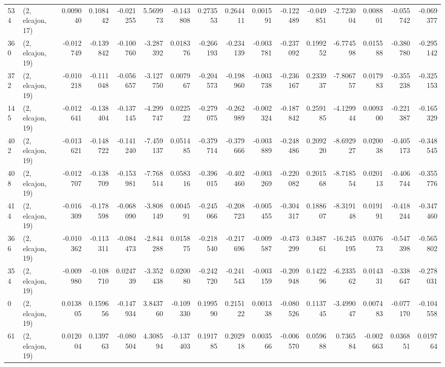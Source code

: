 \begin{tabular}{llrrrrrrrrrrrrrr}
534 &  (2, elcajon, 17) &   0.009040 &  0.108442 & -0.021255 &    5.569973 & -0.143808 &   0.273553 &   0.264411 &  0.001591 & -0.122489 & -0.049851 &   -2.723004 &  0.008801 &  -0.055742 &  -0.069377 \\
360 &  (2, elcajon, 19) &  -0.012749 & -0.139842 & -0.100760 &   -3.287392 &  0.018376 &  -0.266193 &  -0.234139 & -0.003781 & -0.237092 &  0.199252 &   -6.774598 &  0.015588 &  -0.380780 &  -0.295142 \\
372 &  (2, elcajon, 19) &  -0.010218 & -0.111048 & -0.056657 &   -3.127750 &  0.007967 &  -0.204573 &  -0.198960 & -0.003738 & -0.236167 &  0.233937 &   -7.806757 &  0.017983 &  -0.355238 &  -0.325153 \\
145 &  (2, elcajon, 19) &  -0.012641 & -0.138404 & -0.137145 &   -4.299747 &  0.022522 &  -0.279075 &  -0.262989 & -0.002324 & -0.187842 &  0.259185 &   -4.129944 &  0.009300 &  -0.221387 &  -0.165329 \\
402 &  (2, elcajon, 19) &  -0.013621 & -0.148722 & -0.141240 &   -7.459137 &  0.051485 &  -0.379714 &  -0.379666 & -0.003889 & -0.248486 &  0.209220 &   -8.692927 &  0.020038 &  -0.405173 &  -0.348545 \\
408 &  (2, elcajon, 19) &  -0.012707 & -0.138709 & -0.153981 &   -7.768514 &  0.058316 &  -0.396015 &  -0.402460 & -0.003269 & -0.220082 &  0.201568 &   -8.718554 &  0.020113 &  -0.406744 &  -0.355776 \\
414 &  (2, elcajon, 19) &  -0.016309 & -0.178598 & -0.068090 &   -3.808149 &  0.004591 &  -0.245066 &  -0.208723 & -0.005455 & -0.304317 &  0.188607 &   -8.319148 &  0.019191 &  -0.418244 &  -0.347460 \\
366 &  (2, elcajon, 19) &  -0.010362 & -0.113311 & -0.084473 &   -2.844288 &  0.015875 &  -0.218540 &  -0.217696 & -0.009587 & -0.473299 &  0.348761 &  -16.245195 &  0.037673 &  -0.547398 &  -0.565802 \\
354 &  (2, elcajon, 19) &  -0.009980 & -0.108710 &  0.024739 &   -3.352438 &  0.020080 &  -0.242720 &  -0.241543 & -0.003159 & -0.209948 &  0.142296 &   -6.233562 &  0.014331 &  -0.338647 &  -0.278031 \\
0   &  (2, elcajon, 19) &   0.013805 &  0.159656 & -0.147934 &    3.843760 & -0.109330 &   0.199590 &   0.215122 &  0.001338 & -0.080526 &  0.113745 &   -3.499047 &  0.007483 &  -0.077170 &  -0.104558 \\
61  &  (2, elcajon, 19) &   0.012004 &  0.139763 & -0.080504 &    4.308594 & -0.137403 &   0.191785 &   0.202918 &  0.003566 & -0.006570 &  0.059688 &    0.736584 & -0.002663 &   0.036851 &   0.019764 \\

\end{tabular}

